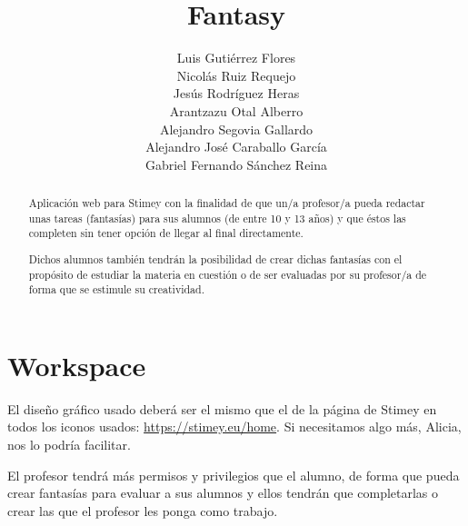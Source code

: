\documentclass[12pt,letterpaper]{article}
\title{Fantasy}
\author{Luis Gutiérrez Flores\\
	Nicolás Ruiz Requejo\\
	Jesús Rodríguez Heras\\
	Arantzazu Otal Alberro\\
	Alejandro Segovia Gallardo\\
	Alejandro José Caraballo García\\
	Gabriel Fernando Sánchez Reina}
\begin{document}
	
	\maketitle
	\begin{abstract} %
			Aplicación web para Stimey con la finalidad de que un/a profesor/a pueda redactar unas tareas (fantasías) para sus alumnos (de entre 10 y 13 años) y que éstos las completen sin tener opción de llegar al final directamente.
			
			Dichos alumnos también tendrán la posibilidad de crear dichas fantasías con el propósito de estudiar la materia en cuestión o de ser evaluadas por su profesor/a de forma que se estimule su creatividad.
	\end{abstract}
	\thispagestyle{empty}
	\newpage
	
	
	
	
	
	\lstset{language=bash, numbers=left, numberstyle=\tiny, numbersep=10pt, firstnumber=1, stepnumber=1, basicstyle=\small\ttfamily, tabsize=1, extendedchars=true, inputencoding=latin1}

\section{Workspace}
El diseño gráfico usado deberá ser el mismo que el de la página de Stimey en todos los iconos usados: \url{https://stimey.eu/home}. Si necesitamos algo más, Alicia, nos lo podría facilitar.

El profesor tendrá más permisos y privilegios que el alumno, de forma que pueda crear fantasías para evaluar a sus alumnos y ellos tendrán que completarlas o crear las que el profesor les ponga como trabajo.
\end{document}
